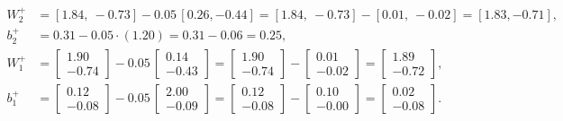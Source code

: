 \documentclass[11pt]{article}
\begin{document}
\begin{align*}
W_2^+&=[1.84,\ -0.73]-0.05\,[0.26, -0.44]=[1.84,\ -0.73]-[0.01,\ -0.02]=[1.83, -0.71],\\
b_2^+&=0.31-0.05\cdot(1.20)=0.31-0.06=0.25,\\
W_1^+&=\begin{bmatrix}1.90\\-0.74\end{bmatrix}-0.05\,\begin{bmatrix}0.14\\-0.43\end{bmatrix}=\begin{bmatrix}1.90\\-0.74\end{bmatrix}-\begin{bmatrix}0.01\\-0.02\end{bmatrix}=\begin{bmatrix}1.89\\-0.72\end{bmatrix},\\
b_1^+&=\begin{bmatrix}0.12\\-0.08\end{bmatrix}-0.05\,\begin{bmatrix}2.00\\-0.09\end{bmatrix}=\begin{bmatrix}0.12\\-0.08\end{bmatrix}-\begin{bmatrix}0.10\\-0.00\end{bmatrix}=\begin{bmatrix}0.02\\-0.08\end{bmatrix}.
\end{align*}
\end{document}
